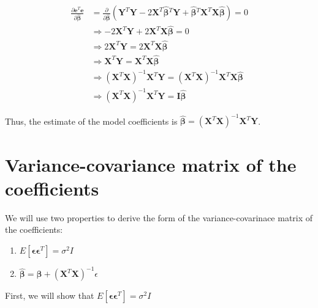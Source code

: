 \documentclass[]{book}
\providecommand{\tightlist}{%
  \setlength{\itemsep}{0pt}\setlength{\parskip}{0pt}}
\begin{document}
\begin{equation}
\begin{aligned}
\frac{\partial \mathbf{e}^T\mathbf{e}}{\partial \hat{\boldsymbol{\beta}}} & = \frac{\partial}{\partial \hat{\boldsymbol{\beta}}}(\mathbf{Y}^T\mathbf{Y} - 2 \mathbf{X}^T\hat{\boldsymbol{\beta}}{}^T\mathbf{Y} + \hat{\boldsymbol{\beta}}{}^{T}\mathbf{X}^T\mathbf{X}\hat{\boldsymbol{\beta}}) = 0 \\[10pt]
&\Rightarrow - 2 \mathbf{X}^T\mathbf{Y} + 2 \mathbf{X}^T\mathbf{X}\hat{\boldsymbol{\beta}} = 0 \\[10pt]
& \Rightarrow 2 \mathbf{X}^T\mathbf{Y} = 2 \mathbf{X}^T\mathbf{X}\hat{\boldsymbol{\beta}} \\[10pt]
& \Rightarrow \mathbf{X}^T\mathbf{Y} = \mathbf{X}^T\mathbf{X}\hat{\boldsymbol{\beta}} \\[10pt]
& \Rightarrow (\mathbf{X}^T\mathbf{X})^{-1}\mathbf{X}^T\mathbf{Y} = (\mathbf{X}^T\mathbf{X})^{-1}\mathbf{X}^T\mathbf{X}\hat{\boldsymbol{\beta}} \\[10pt]
& \Rightarrow (\mathbf{X}^T\mathbf{X})^{-1}\mathbf{X}^T\mathbf{Y} = \mathbf{I}\hat{\boldsymbol{\beta}}
\end{aligned}
\end{equation}

Thus, the estimate of the model coefficients is
\(\hat{\boldsymbol{\beta}} = (\mathbf{X}^T\mathbf{X})^{-1}\mathbf{X}^T\mathbf{Y}\).

\section{Variance-covariance matrix of the
coefficients}\label{variance-covariance-matrix-of-the-coefficients}

We will use two properties to derive the form of the variance-covarinace
matrix of the coefficients:

\begin{enumerate}
\def\labelenumi{\arabic{enumi}.}
\tightlist
\item
  \(E[\boldsymbol{\epsilon}\boldsymbol{\epsilon}^T] = \sigma^2I\)
\item
  \(\hat{\boldsymbol{\beta}} = \boldsymbol{\beta} + (\mathbf{X}^T\mathbf{X})^{-1}\epsilon\)
\end{enumerate}

First, we will show that
\(E[\boldsymbol{\epsilon}\boldsymbol{\epsilon}^T] = \sigma^2I\)
\end{document}
